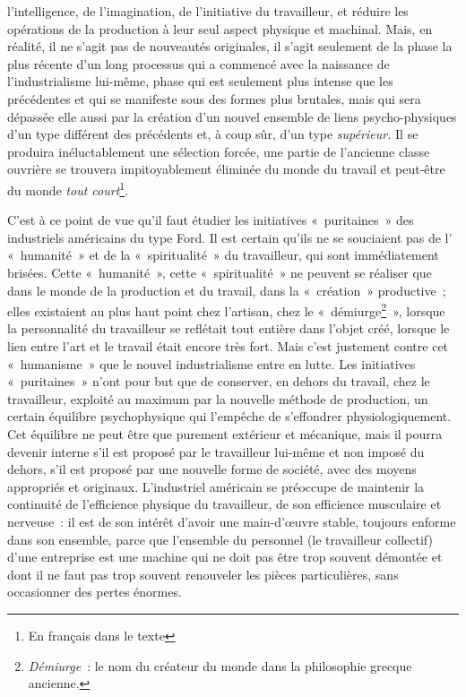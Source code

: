 \documentclass[french,twoside]{book} %
\begin{document}
l’intelligence, de l’imagination, de l’initiative du travailleur, et réduire les opérations de la production à leur seul aspect physique et machinal. Mais, en réalité, il ne s’agit pas de nouveautés originales, il s’agit seulement de la phase la plus récente d’un long processus qui a commencé avec la naissance de l’industrialisme lui-même, phase qui est seulement plus intense que les précédentes et qui se manifeste sous des formes plus brutales, mais qui sera dépassée elle aussi par la création d’un nouvel ensemble de liens psycho-physiques d’un type différent des précédents et, à coup sûr, d’un type \emph{supérieur.} Il se produira inéluctablement une sélection forcée, une partie de l’ancienne classe ouvrière se trouvera impitoyablement éliminée du monde du travail et peut-être du monde \emph{tout court}\footnote{En français dans le texte}.\par
C'est à ce point de vue qu’il faut étudier les initiatives « puritaines » des industriels américains du type Ford. Il est certain qu’ils ne se souciaient pas de l’ « humanité » et de la « spiritualité » du travailleur, qui sont immédiatement brisées. Cette « humanité », cette « spiritualité » ne peuvent se réaliser que dans le monde de la production et du travail, dans la « création » productive ; elles existaient au plus haut point chez l’artisan, chez le « démiurge\footnote{\emph{Démiurge} : le nom du créateur du monde dans la philosophie grecque ancienne.} », lorsque la personnalité du travailleur se reflétait tout entière dans l’objet créé, lorsque le lien entre l’art et le travail était encore très fort. Mais c’est justement contre cet « humanisme » que le nouvel industrialisme entre en lutte. Les initiatives « puritaines » n’ont pour but que de conserver, en dehors du travail, chez le travailleur, exploité au maximum par la nouvelle méthode de production, un certain équilibre psychophysique qui l’empêche de s’effondrer physiologiquement. Cet équilibre ne peut être que purement extérieur et mécanique, mais il pourra devenir interne s’il est proposé par le travailleur lui-même et non imposé du dehors, s’il est proposé par une nouvelle forme de société, avec des moyens appropriés et originaux. L'industriel américain se préoccupe de maintenir la continuité de l’efficience physique du travailleur, de son efficience musculaire et nerveuse : il est de son intérêt d’avoir une main-d’œuvre stable, toujours enforme dans son ensemble, parce que l’ensemble du personnel (le travailleur collectif) d’une entreprise est une machine qui ne doit pas être trop souvent démontée et dont il ne faut pas trop souvent renouveler les pièces particulières, sans occasionner des pertes énormes.\par
\end{document}
